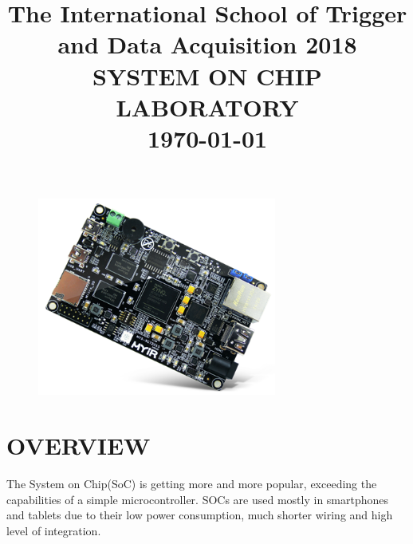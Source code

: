 \documentclass{article}
\begin{document}
\title{ \LARGE \normalsize {The International School of Trigger and Data Acquisition 2018} \vspace{8cm} \\
		\LARGE \textbf{\uppercase{System on Chip Laboratory}} \\ 
		\normalsize \today \vspace*{2\baselineskip}}

\date{}

\maketitle

\begin{figure}[h!]
    \centering
    \includegraphics[width=0.7\textwidth]{img/zturn.png}
\end{figure}


\newpage
\tableofcontents
\newpage

\sectionfont{\scshape}


\section{OVERVIEW}



The System on Chip(SoC) is getting more and more popular, exceeding the capabilities of a simple microcontroller. SOCs are used mostly in smartphones and tablets due to their low power consumption, much shorter wiring and high level of integration.
\end{document}
